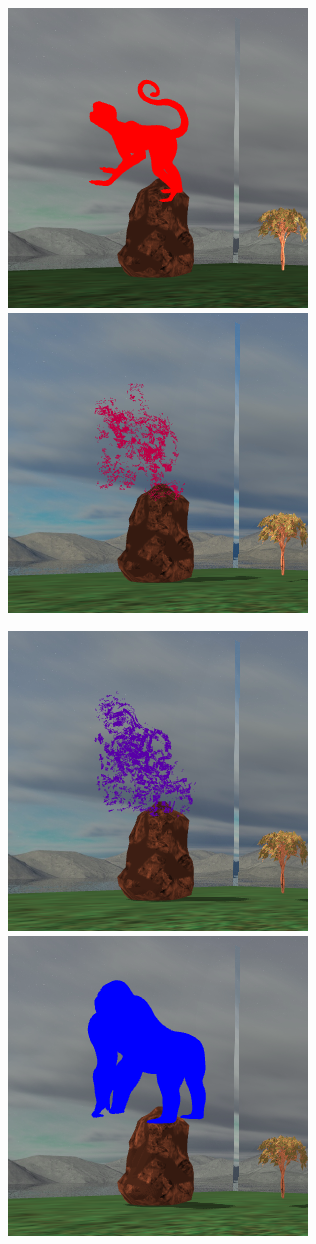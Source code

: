 \documentclass[11pt]{scrartcl} %
\newenvironment{centerimg}[1]%
{%
    \begin{figure}[H]
        #1
    \begin{center}
}%
{%
    \end{center}
    \end{figure}
}
\begin{document}
\begin{centerimg}{\caption{Η διαδικασία της μεταμόρφωσης.}}
    \begin{subfigure}[b]{\textwidth}
        \begin{center}
        \includegraphics[width=.4\textwidth]{./assets/trans_1.png}
        \includegraphics[width=.4\textwidth]{./assets/trans_2.png}
        \end{center}
    \end{subfigure}
    \begin{subfigure}[b]{\textwidth}
        \begin{center}
        \includegraphics[width=.4\textwidth]{./assets/trans_3.png}
        \includegraphics[width=.4\textwidth]{./assets/trans_4.png}
        \end{center}
    \end{subfigure}
\end{centerimg}
\end{document}

